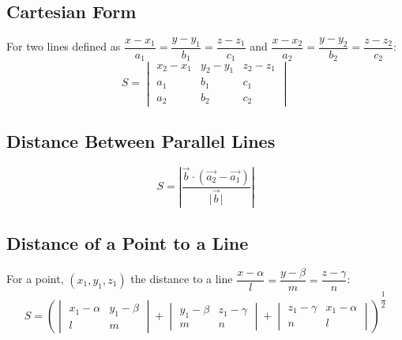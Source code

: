 \subsection{Cartesian Form}
For two lines defined as $\dfrac{x-x_1}{a_1}=\dfrac{y-y_1}{b_1}=\dfrac{z-z_1}{c_1}$ and $\dfrac{x-x_2}{a_2}=\dfrac{y-y_2}{b_2}=\dfrac{z-z_2}{c_2}$:
\begin{equation}
	S=\begin{vmatrix}
		x_2-x_1&y_2-y_1&z_2-z_1\\
		a_1&b_1&c_1\\
		a_2&b_2&c_2
	\end{vmatrix}
\end{equation}

\subsection{Distance Between Parallel Lines}
\begin{equation}
	S=\left| \dfrac{\vec{b}\cdot(\vec{a_2}-\vec{a_1})}{\lvert \vec{b} \rvert} \right|
\end{equation}

\subsection{Distance of a Point to a Line}
For a point, $(x_1,y_1,z_1)$ the distance to a line $\dfrac{x-\alpha}{l}=\dfrac{y-\beta}{m}=\dfrac{z-\gamma}{n}$:
\begin{equation}
	S=\left(
	\begin{vmatrix}
		x_1-\alpha&y_1-\beta\\
		l&m
	\end{vmatrix}+
	\begin{vmatrix}
		y_1-\beta&z_1-\gamma\\
		m&n
	\end{vmatrix}+
	\begin{vmatrix}
		z_1-\gamma&x_1-\alpha\\
		n&l
	\end{vmatrix}
	\right)^{\dfrac{1}{2}}
\end{equation}
